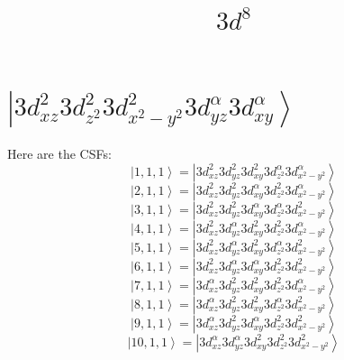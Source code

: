 \documentclass[11pt]{article}
\title{$3d^{8}$}
\begin{document}
\maketitle
\section{$\left|3d_{xz}^{2}3d_{z^2}^{2}3d_{x^2-y^2}^{2}3d_{yz}^{\alpha}3d_{xy}^{\alpha}\right\rangle$}

Here are the CSFs:\newline\newline
\begin{equation*}
\left|1,1,1\right>=\left|3d_{xz}^{2}3d_{yz}^{2}3d_{xy}^{2}3d_{z^2}^{\alpha}3d_{x^2-y^2}^{\alpha}\right>\end{equation*}
\begin{equation*}
\left|2,1,1\right>=\left|3d_{xz}^{2}3d_{yz}^{2}3d_{xy}^{\alpha}3d_{z^2}^{2}3d_{x^2-y^2}^{\alpha}\right>\end{equation*}
\begin{equation*}
\left|3,1,1\right>=\left|3d_{xz}^{2}3d_{yz}^{2}3d_{xy}^{\alpha}3d_{z^2}^{\alpha}3d_{x^2-y^2}^{2}\right>\end{equation*}
\begin{equation*}
\left|4,1,1\right>=\left|3d_{xz}^{2}3d_{yz}^{\alpha}3d_{xy}^{2}3d_{z^2}^{2}3d_{x^2-y^2}^{\alpha}\right>\end{equation*}
\begin{equation*}
\left|5,1,1\right>=\left|3d_{xz}^{2}3d_{yz}^{\alpha}3d_{xy}^{2}3d_{z^2}^{\alpha}3d_{x^2-y^2}^{2}\right>\end{equation*}
\begin{equation*}
\left|6,1,1\right>=\left|3d_{xz}^{2}3d_{yz}^{\alpha}3d_{xy}^{\alpha}3d_{z^2}^{2}3d_{x^2-y^2}^{2}\right>\end{equation*}
\begin{equation*}
\left|7,1,1\right>=\left|3d_{xz}^{\alpha}3d_{yz}^{2}3d_{xy}^{2}3d_{z^2}^{2}3d_{x^2-y^2}^{\alpha}\right>\end{equation*}
\begin{equation*}
\left|8,1,1\right>=\left|3d_{xz}^{\alpha}3d_{yz}^{2}3d_{xy}^{2}3d_{z^2}^{\alpha}3d_{x^2-y^2}^{2}\right>\end{equation*}
\begin{equation*}
\left|9,1,1\right>=\left|3d_{xz}^{\alpha}3d_{yz}^{2}3d_{xy}^{\alpha}3d_{z^2}^{2}3d_{x^2-y^2}^{2}\right>\end{equation*}
\begin{equation*}
\left|10,1,1\right>=\left|3d_{xz}^{\alpha}3d_{yz}^{\alpha}3d_{xy}^{2}3d_{z^2}^{2}3d_{x^2-y^2}^{2}\right>\end{equation*}
\end{document}
